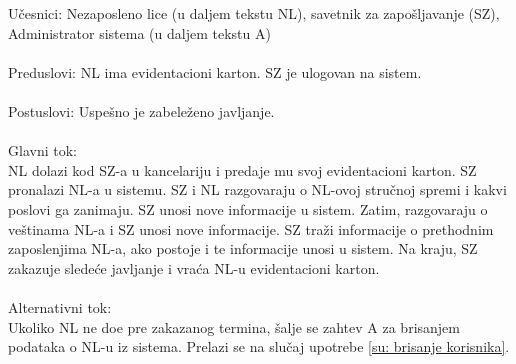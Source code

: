 \noindent U\v cesnici: Nezaposleno lice (u daljem tekstu NL), savetnik za zapo\v sljavanje (SZ), Administrator sistema (u daljem tekstu A)
\\
\\ Preduslovi: NL ima evidentacioni karton. SZ je ulogovan na sistem. 
\\
\\ Postuslovi: Uspe\v sno je zabele\v zeno javljanje.
\\ 
\\ Glavni tok:
\\ NL dolazi kod SZ-a u kancelariju i predaje mu svoj evidentacioni karton. SZ pronalazi NL-a u sistemu. SZ i NL razgovaraju o NL-ovoj stru\v cnoj spremi i kakvi poslovi ga zanimaju. SZ unosi nove informacije u sistem. Zatim, razgovaraju o ve\v stinama NL-a i SZ unosi nove informacije. SZ tra\v zi informacije o prethodnim zaposlenjima NL-a, ako postoje i te informacije unosi u sistem. Na kraju, SZ zakazuje slede\' ce javljanje i vra\' ca NL-u evidentacioni karton.
\\
\\ Alternativni tok:
\\ Ukoliko NL ne do\dj e pre zakazanog termina, \v salje se zahtev A za brisanjem podataka o NL-u iz sistema. Prelazi se na slu\v caj upotrebe \ref{su: brisanje korisnika}.
